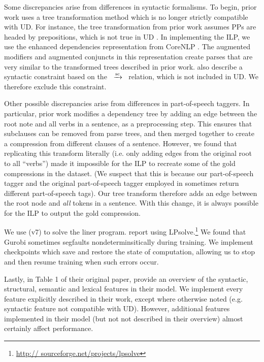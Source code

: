 \documentclass[11pt,a4paper]{article}
\newcommand{\rdep}[1]{\ $\xrightarrow{\text{\tiny #1}}$\ }
\begin{document}
Some discrepancies arise from differences in syntactic formalisms. To begin, prior work uses a tree transformation method which is no longer strictly compatible with UD. For instance, the tree transformation from prior work assumes PPs are headed by prepositions, which is not true in UD \cite{Schuster2016EnhancedEU}. In implementing the ILP, we use the enhanced dependencies representation from CoreNLP \cite{Schuster2016EnhancedEU}. The augmented modifiers and augmented conjuncts in this representation create parses that are very similar to the transformed trees described in prior work. \citet{filippova2008dependency} also describe a syntactic constraint based on the \rdep{sc} relation, which is not included in UD. We therefore exclude this constraint.

Other possible discrepancies arise from differences in part-of-speech taggers. In particular, prior work modifies a dependency tree by adding an edge between the root note and all verbs in a sentence, as a preprocessing step. This ensures that subclauses can be removed from parse trees, and then merged together to create a compression from different clauses of a sentence. However, we found that replicating this transform literally (i.e. only adding edges from the original root to all ``verbs'') made it impossible for the ILP to recreate some of the gold compressions in the dataset. (We suspect that this is because our part-of-speech tagger and the original part-of-speech tagger employed in \citet{filippova2013overcoming} sometimes return different part-of-speech tags). Our tree transform therefore adds an edge between the root node and \textit{all} tokens in a sentence. With this change, it is always possible for the ILP to output the gold compression.

We use \citet{gurobi} (v7) to solve the liner program. \citet{filippova2008dependency} report using LPsolve.\footnote{\url{http://
sourceforge.net/projects/lpsolve}}  We found that Gurobi sometimes segfaults nondeterminsitically during training. We implement checkpoints which save and restore the state of computation, allowing us to stop and then resume training when such errors occur. 

Lastly, in Table 1 of their original paper, \citet{filippova2013overcoming} provide an overview of the syntactic, structural, semantic and lexical features in their model. We implement every feature explicitly described in their work, except where otherwise noted (e.g. syntactic feature not compatible with UD). However, additional features implemented in their model (but not not described in their overview) almost certainly affect performance. 



\end{document}
